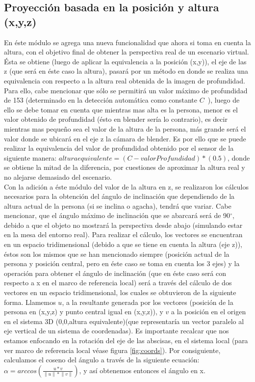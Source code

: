 \documentclass[a4paper,openright,12pt]{report}
\begin{document}
\subsection{Proyección basada en la posición y altura (x,y,z)}
En éste módulo se agrega una nueva funcionalidad que ahora si toma en cuenta la altura, con el objetivo final de obtener la perspectiva real de un escenario virtual. Ésta se obtiene (luego de aplicar la equivalencia a la posición (x,y)), el eje de las z (que será en éste caso la altura), pasará por un método en donde se realiza una equivalencia con respecto a la altura real obtenida de la imagen de profundidad. Para ello, cabe mencionar que sólo se permitirá un valor máximo de profundidad de 153 (determinado en la detección automática como constante $C$\ ), luego de ello se debe tomar en cuenta que mientras mas alta es la persona, menor es el valor obtenido de profundidad (ésto en blender sería lo contrario), es decir mientras mas pequeño sea el valor de la altura de la persona, más grande será el valor donde se ubicará en el eje z la cámara de blender. Es por ello que se puede realizar la equivalencia del valor de profundidad obtenido por el sensor de la siguiente manera: $altura equivalente = (C - valorProfundidad)*(0.5)$, donde se obtiene la mitad de la diferencia, por cuestiones de aproximar la altura real y no alejarse demasiado del escenario.\\
Con la adición a éste módulo del valor de la altura en z, se realizaron los cálculos necesarios para la obtención del ángulo de inclinación que dependiendo de la altura actual de la persona (si se inclina o agacha), tendrá que variar. Cabe mencionar, que el ángulo máximo de inclinación que se abarcará será de 90$^{\circ}$, debido a que el objeto no mostrará la perspectiva desde abajo (simulando estar en la mesa del entorno real). Para realizar el cálculo, los vectores se encuentran en un espacio tridimensional (debido a que se tiene en cuenta la altura (eje z)), éstos son los mismos que se han mencionado siempre (posición actual de la persona y posición central, pero en éste caso se toma en cuenta los 3 ejes) y la operación para obtener el ángulo de inclinación (que en éste caso será con respecto a x en el marco de referencia local) será a través del cálculo de dos vectores en un espacio tridimensional, los cuales se obtuvieron de la siguiente forma. Llamemos $u$, a la resultante generada por los vectores (posición de la persona en (x,y,z) y punto central igual en (x,y,z)), y $v$ a la posición en el origen en el sistema 3D (0,0,altura equivalente)(que representaría un vector paralelo al eje vertical de un sistema de coordenadas). Es importante recalcar que nos estamos enfocando en la rotación del eje de las abscisas, en el sistema local (para ver marco de referencia local véase figura \ref{fig:coords}). Por consiguiente, calculamos el coseno del ángulo a través de la siguiente ecuación: \(\alpha =arccos(\frac { u*v }{ \left\| u \right\| *\left\| v \right\|  } )\), y así obtenemos entonces el ángulo en x.
\end{document}
